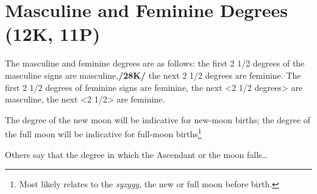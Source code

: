 \section{Masculine and Feminine Degrees (12K, 11P)}
The masculine and feminine degrees are as follows: the first 2 1/2 degrees of the masculine signs are masculine,\textbf{/28K/} the next 2 1/2 degrees are feminine. The first 2 1/2 degrees of feminine signs are feminine, the next <2 1/2 degrees> are masculine, the next <2 1/2> are feminine. 

\mndl[0.2cm]
The degree of the new moon will be indicative for new-moon births; the degree of the full moon will be indicative for full-moon births\footnote{Most likely relates to the \textsl{syzygy}, the new or full moon before birth.} 

Others say that the degree in which the Ascendant or the moon falls\ldots

\newpage